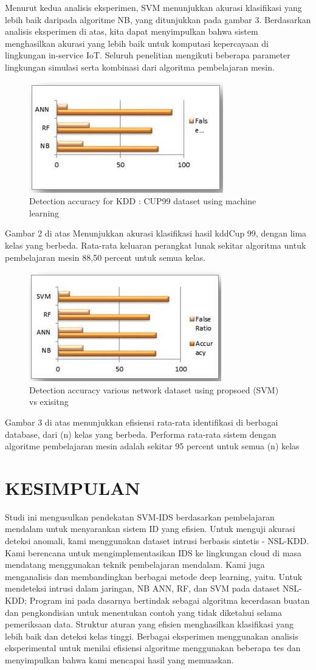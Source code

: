 \documentclass[conference]{IEEEtran}
\begin{document}
Menurut kedua analisis eksperimen, SVM menunjukkan akurasi klasifikasi yang lebih baik daripada algoritme NB, yang ditunjukkan pada gambar 3. Berdasarkan analisis eksperimen di atas, kita dapat menyimpulkan bahwa sistem menghasilkan akurasi yang lebih baik untuk komputasi kepercayaan di lingkungan in-service IoT. Seluruh penelitian mengikuti beberapa parameter lingkungan simulasi serta kombinasi dari algoritma pembelajaran mesin.

\begin{figure}
\centering
\includegraphics[width=.3\textwidth]{Gambar/pct2.jpg}
\caption{Detection accuracy for KDD : CUP99 dataset using machine learning}
\end{figure}

Gambar 2 di atas Menunjukkan akurasi klasifikasi hasil kddCup 99, dengan lima kelas yang berbeda. Rata-rata keluaran perangkat lunak sekitar algoritma untuk pembelajaran mesin 88,50 percent untuk semua kelas.

\begin{figure}
\centering
\includegraphics[width=.3\textwidth]{Gambar/pct3.jpg}
\caption{Detection accuracy various network dataset using propsoed (SVM) vs exisitng}
\end{figure}

Gambar 3 di atas menunjukkan efisiensi rata-rata identifikasi di berbagai database, dari (n) kelas yang berbeda. Performa rata-rata sistem dengan algoritme pembelajaran mesin adalah sekitar 95 percent untuk semua (n) kelas

\section*{KESIMPULAN}

Studi ini mengusulkan pendekatan SVM-IDS berdasarkan pembelajaran mendalam untuk menyarankan sistem ID yang efisien. Untuk menguji akurasi deteksi anomali, kami menggunakan dataset intrusi berbasis sintetis - NSL-KDD. Kami berencana untuk mengimplementasikan IDS ke lingkungan cloud di masa mendatang menggunakan teknik pembelajaran mendalam. Kami juga menganalisis dan membandingkan berbagai metode deep learning, yaitu. Untuk mendeteksi intrusi dalam jaringan, NB ANN, RF, dan SVM pada dataset NSL-KDD; Program ini pada dasarnya bertindak sebagai algoritma kecerdasan buatan dan pengkondisian untuk menentukan contoh yang tidak diketahui selama pemeriksaan data. Struktur aturan yang efisien menghasilkan klasifikasi yang lebih baik dan deteksi kelas tinggi. Berbagai eksperimen menggunakan analisis eksperimental untuk menilai efisiensi algoritme menggunakan beberapa tes dan menyimpulkan bahwa kami mencapai hasil yang memuaskan.
\end{document}
